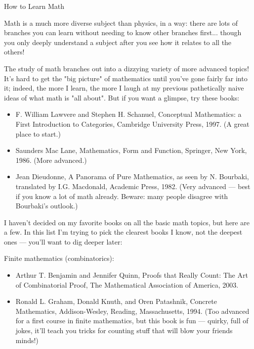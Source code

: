 \documentclass[10pt,a4paper]{book}
\theoremstyle{definition}
\begin{document}
How to Learn Math

Math is a much more diverse subject than physics, in a way: there are lots of branches you can learn without needing to know other branches first... though you only deeply understand a subject after you see how it relates to all the others!

The study of math branches out into a dizzying variety of more advanced topics! It's hard to get the "big picture" of mathematics until you've gone fairly far into it; indeed, the more I learn, the more I laugh at my previous pathetically naive ideas of what math is "all about". But if you want a glimpse, try these books:

\begin{itemize}
\item F. William Lawvere and Stephen H. Schanuel, Conceptual Mathematics: a First Introduction to Categories, Cambridge University Press, 1997. (A great place to start.)

\item Saunders Mac Lane, Mathematics, Form and Function, Springer, New York, 1986. (More advanced.)

\item Jean Dieudonne, A Panorama of Pure Mathematics, as seen by N. Bourbaki, translated by I.G. Macdonald, Academic Press, 1982. (Very advanced — best if you know a lot of math already. Beware: many people disagree with Bourbaki's outlook.)
\end{itemize}

I haven't decided on my favorite books on all the basic math topics, but here are a few. In this list I'm trying to pick the clearest books I know, not the deepest ones — you'll want to dig deeper later:

Finite mathematics (combinatorics):

\begin{itemize}
\item Arthur T. Benjamin and Jennifer Quinn, Proofs that Really Count: The Art of Combinatorial Proof, The Mathematical Association of America, 2003.

\item Ronald L. Graham, Donald Knuth, and Oren Patashnik, Concrete Mathematics, Addison-Wesley, Reading, Massachusetts, 1994. (Too advanced for a first course in finite mathematics, but this book is fun — quirky, full of jokes, it'll teach you tricks for counting stuff that will blow your friends minds!)
\end{itemize}
\end{document}
